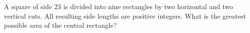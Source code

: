 A square of side $23$ is divided into nine rectangles by two horizontal and two vertical cuts. All resulting side lengths are positive integers. What is the greatest possible area of the central rectangle?
